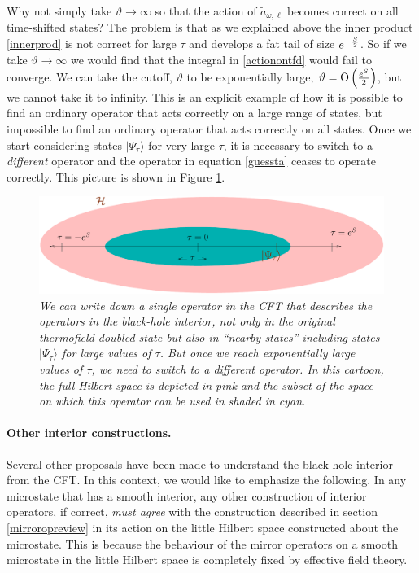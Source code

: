 \documentclass[12pt]{article}
\newcommand{\tfdtau}{\Psi_{\tau}} %
\newcommand{\cop}[1]{#1}
\def\ta{\widetilde{\cop{a}}}
\def\cutoffT{\vartheta}
\def\Or[#1]{{\text{O}}\left({#1}\right)}
\begin{document}
Why not simply take $\cutoffT \rightarrow \infty$ so that the action of $\ta_{\omega, \ell}$ becomes correct on all time-shifted states? The problem is that as we explained above the inner product \eqref{innerprod} is not correct for large $\tau$ and develops a fat tail of size $e^{-{S \over 2}}$. So if we take $\cutoffT \rightarrow \infty$ we would find that the integral in \eqref{actionontfd} would fail to converge. We can take the cutoff, $\cutoffT$ to be exponentially large, $\cutoffT = \Or[e^{S \over 2}]$, but we cannot take it to infinity. This is an explicit example of how it is possible to find
an ordinary  operator that acts correctly on a large range of states, but impossible to find an ordinary  operator that acts correctly on all states. Once we start considering states $|\tfdtau \rangle$ for very large $\tau$, it is necessary to switch to a {\em different} operator and the operator in equation \eqref{guessta} ceases to operate correctly. This picture is shown in Figure \ref{tshiftpatches}.
\begin{figure}[!ht]
\begin{center}
\includegraphics[width=\textwidth]{tshiftpatcheshpsi.pdf}
\caption{\em We can write down a single operator in the CFT that describes the operators in the black-hole interior, not only in the original thermofield doubled state but also in ``nearby states'' including states $|\tfdtau \rangle$ for large values of $\tau$. But once we reach exponentially large values of $\tau$, we need to switch to a different operator. In this cartoon, the full Hilbert space is depicted in pink and the subset of the space on which this operator can be used in shaded in cyan. \label{tshiftpatches}}
\end{center}
\end{figure}














\paragraph{\bf Other interior constructions.}
Several other proposals have been made to understand the black-hole interior from the CFT. In this context, we would like to emphasize the following. In any microstate that has a smooth interior, any other construction of interior operators, if correct, {\em must agree} with the construction described in section \ref{mirroropreview} in its action on the little Hilbert space constructed about the microstate. This is because the behaviour of the mirror operators on a smooth microstate in the little Hilbert space is completely fixed by effective field theory.
\end{document}
